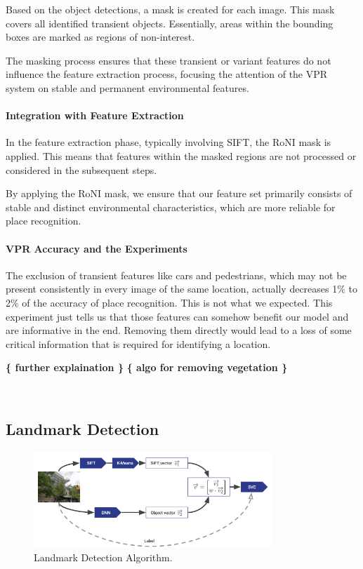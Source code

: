 \documentclass[conference]{IEEEtran}
\begin{document}
Based on the object detections, a mask is created for each image. This mask covers all identified transient objects. Essentially, areas within the bounding boxes are marked as regions of non-interest.

The masking process ensures that these transient or variant features do not influence the feature extraction process, focusing the attention of the VPR system on stable and permanent environmental features.

\paragraph{Integration with Feature Extraction}

In the feature extraction phase, typically involving SIFT, the RoNI mask is applied. This means that features within the masked regions are not processed or considered in the subsequent steps.

By applying the RoNI mask, we ensure that our feature set primarily consists of stable and distinct environmental characteristics, which are more reliable for place recognition.

\paragraph{VPR Accuracy and the Experiments}

The exclusion of transient features like cars and pedestrians, which may not be present consistently in every image of the same location, actually decreases 1\% to 2\% of the accuracy of place recognition. This is not what we expected. This experiment just tells us that those features can somehow benefit our model and are informative in the end. Removing them directly would lead to a loss of some critical information that is required for identifying a location.

\textbf{ \{ further explaination \} }
\textbf{ \{ algo for removing vegetation \} }

\\

\subsection{Landmark Detection}
\begin{figure}[htbp]
\centerline{\includegraphics[width=9cm]{landmark.png}}
\caption{Landmark Detection Algorithm.}
\label{fig}
\end{figure}
\end{document}
